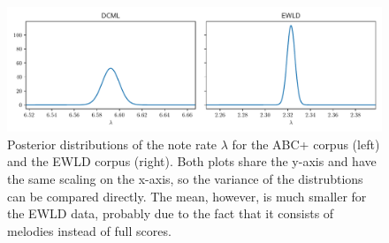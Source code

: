 \documentclass[a4]{scrartcl}
\begin{document}
\begin{figure}[h]
  \centering
  \includegraphics[width=\textwidth]{plots/note_rates.pdf}
  \caption[Posterior distributions of the note rate $\lambda$.]{
    Posterior distributions of the note rate $\lambda$
    for the ABC+ corpus (left) and the EWLD corpus (right).
    Both plots share the y-axis and have the same scaling on the x-axis,
    so the variance of the distrubtions can be compared directly.
    The mean, however, is much smaller for the EWLD data,
    probably due to the fact that it consists of melodies instead of full scores.
  }
  \label{fig:harmonies-ornaments.post-rates}
\end{figure}







\end{document}
